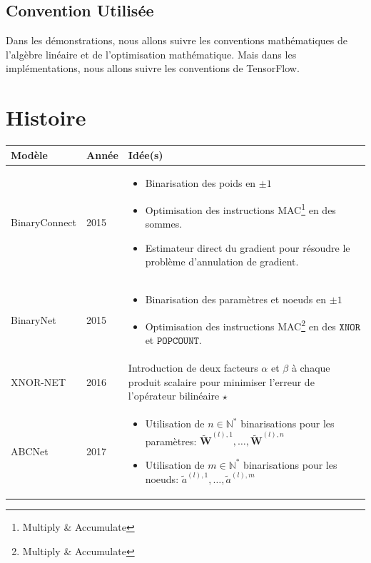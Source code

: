 \subsection{Convention Utilisée}
Dans les démonstrations, nous allons suivre les conventions mathématiques de l'algèbre linéaire et de l'optimisation mathématique. Mais dans les implémentations, nous allons suivre les conventions de TensorFlow.

\newpage
\section{Histoire}
\begin{table}[h]
	\small
	\begin{tabularx}{\textwidth}{| p{2.5cm} | p{1cm} | X |}
		\hline
		
		Modèle & Année & Idée(s)  \\
		\hline 
		BinaryConnect\cite{BinaryConnectPaper} & 2015 & \begin{itemize}
			\item Binarisation des poids en $\pm 1$
			\item Optimisation des instructions MAC\footnote{Multiply \& Accumulate} en des sommes.
			\item Estimateur direct du gradient pour résoudre le problème d'annulation de gradient.
		\end{itemize}\\
		\hline
		BinaryNet\cite{BinaryNetPaper} & 2015 & \begin{itemize}
			\item Binarisation des paramètres et noeuds en $\pm 1$
			\item Optimisation des instructions MAC\footnote{Multiply \& Accumulate} en des $\mathtt{XNOR}$ et $\mathtt{POPCOUNT}$.
		\end{itemize} \\
		\hline  
		XNOR-NET\cite{XnorNetPaper} & 2016 &  Introduction de deux facteurs $\alpha$ et $\beta$ à chaque produit scalaire pour minimiser l'erreur de l'opérateur bilinéaire $\star$  \\
		\hline
		ABCNet\cite{ABCNetPaper} & 2017 &  \begin{itemize}
			\item Utilisation de $n\in\mathbb{N}^*$ binarisations pour les paramètres: $\widetilde{\boldsymbol{W}}^{(l),1},\dots,\widetilde{\boldsymbol{W}}^{(l),n}$
			\item Utilisation de $m\in\mathbb{N}^*$ binarisations pour les noeuds: $\tilde{a}^{(l),1},\dots,\tilde{a}^{(l),m}$

\end{itemize}
\end{tabularx}
\end{table}
